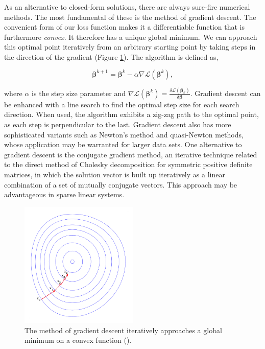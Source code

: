 \documentclass[11pt]{amsart}
\begin{document}
As an alternative to closed-form solutions, there are always sure-fire numerical methods. The most fundamental of these is the method of gradient descent. The convenient form of our loss function makes it a differentiable function that is furthermore \emph{convex}. It therefore has a unique global minimum. We can approach this optimal point iteratively from an arbitrary starting point by taking steps in the direction of the gradient (Figure \ref{fig:gradientdescent}). The algorithm is defined as,

$$\boldsymbol\beta^{k+1} = \boldsymbol\beta^{k} - \alpha \nabla\mathcal{L}(\boldsymbol\beta^k),$$

where $\alpha$ is the step size parameter and $\nabla\mathcal{L}(\boldsymbol\beta^k) = \frac{\delta\mathcal{L}(\boldsymbol\beta_k)}{\delta\boldsymbol\beta}$. Gradient descent can be enhanced with a line search to find the optimal step size for each search direction. When used, the algorithm exhibits a zig-zag path to the optimal point, as each step is perpendicular to the last. Gradient descent also has more sophisticated variants such as Newton's method and quasi-Newton methods, whose application may be warranted for larger data sets. One alternative to gradient descent is the conjugate gradient method, an iterative technique related to the direct method of Cholesky decomposition for symmetric positive definite matrices, in which the solution vector is built up iteratively as a linear combination of a set of mutually conjugate vectors. This approach may be advantageous in sparse linear systems.

\begin{figure}[!ht]
\centering
\includegraphics[width=0.5\textwidth]{Figures/gradientdescent.png}
\caption{The method of gradient descent iteratively approaches a global minimum on a convex function (\cite{gradientdescent}).}
\label{fig:gradientdescent}
\end{figure}
\end{document}
